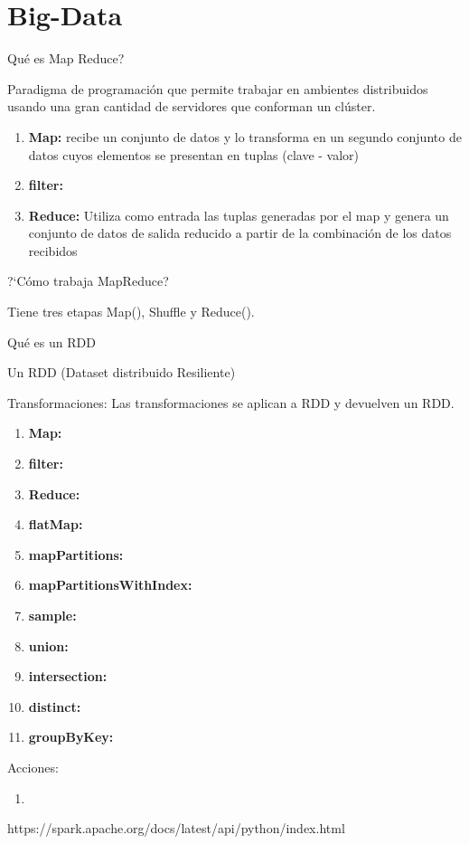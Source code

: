 \chapter{Big-Data}

Qu\'e es Map Reduce?

Paradigma de programaci\'on que permite trabajar en ambientes distribuidos usando una gran cantidad 
de servidores que conforman un cl\'uster. 

\begin{enumerate}
    \item {\bf Map: } recibe un conjunto de datos y lo transforma en un segundo conjunto de datos cuyos elementos se presentan en tuplas (clave - valor)
    \item {\bf filter: } 
    \item {\bf Reduce: } Utiliza como entrada las tuplas generadas por el map y genera un conjunto de datos de salida reducido a partir de la combinaci\'on de los datos recibidos
\end{enumerate}


?`C\'omo trabaja MapReduce?

Tiene tres etapas Map(), Shuffle y Reduce(). 

Qu\'e es un RDD

Un RDD (Dataset distribuido Resiliente) 

Transformaciones:
Las transformaciones se aplican a RDD y devuelven un RDD.
\begin{enumerate}
    \item {\bf Map: }
    \item {\bf filter: }
    \item {\bf Reduce: }
    \item {\bf flatMap: }
    \item {\bf mapPartitions: }
    \item {\bf mapPartitionsWithIndex: }
    \item {\bf sample: }
    \item {\bf union: }
    \item {\bf intersection: }
    \item {\bf distinct: }
    \item {\bf groupByKey: }
\end{enumerate}

Acciones:

\begin{enumerate}
    \item 
\end{enumerate}

https://spark.apache.org/docs/latest/api/python/index.html